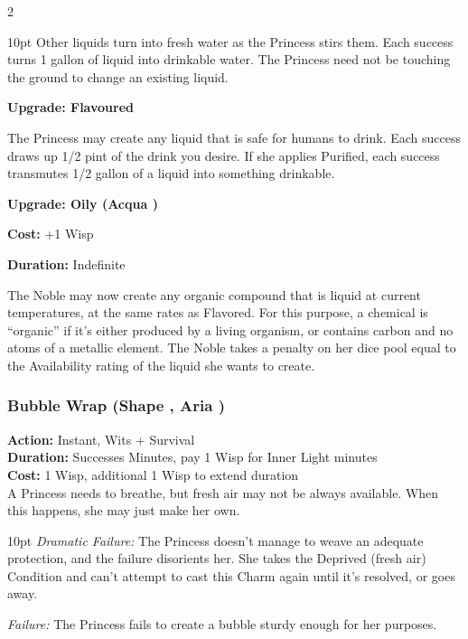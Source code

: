 \begin{multicols}{2}
\begin{myindentpar}{10pt}
Other liquids turn into fresh water as the Princess stirs them. Each success turns 1 gallon of liquid into drinkable water. The Princess need not be touching the ground to change an existing liquid.

\textbf{Upgrade: Flavoured}

The Princess may create any liquid that is safe for humans to drink. Each success draws up 1/2 pint of the drink you desire. If she applies Purified, each success transmutes 1/2 gallon of a liquid into something drinkable.

\textbf{Upgrade: Oily (Acqua \textbullet\textbullet)}

\noindent \textbf{Cost:} +1 Wisp

\noindent \textbf{Duration:} Indefinite

\noindent The Noble may now create any organic compound that is liquid at current temperatures, at the same rates as Flavored. For this purpose, a chemical is “organic” if it’s either produced by a living organism, or contains carbon and no atoms of a metallic element. The Noble takes a penalty on her dice pool equal to the Availability rating of the liquid she wants to create.
\end{myindentpar}


\subsubsection*{Bubble Wrap (Shape \textbullet, Aria \textbullet)}
\noindent \textbf{Action:} Instant, Wits + Survival\\

\noindent \textbf{Duration:} Successes Minutes, pay 1 Wisp for Inner Light minutes\\

\noindent \textbf{Cost:} 1 Wisp, additional 1 Wisp to extend duration\\

\noindent A Princess needs to breathe, but fresh air may not be always available. When this happens, she may just make her own.

\begin{myindentpar}{10pt}    \emph{Dramatic Failure:} The Princess doesn't manage to weave an adequate protection, and the failure disorients her. She takes the Deprived (fresh air) Condition and can't attempt to cast this Charm again until it's resolved, or goes away.

\emph{Failure:} The Princess fails to create a bubble sturdy enough for her purposes.


\end{myindentpar}
\end{multicols}
